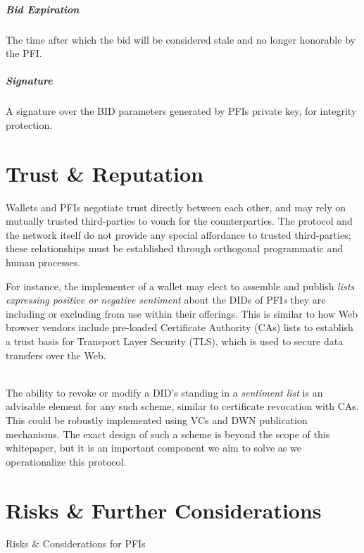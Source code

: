 \documentclass[11pt]{article}
\begin{document}
\subparagraph{Bid Expiration}

The time after which the bid will be considered stale and no longer honorable by the PFI. 

\subparagraph{Signature}

A signature over the BID parameters generated by PFIs private key, for integrity protection. 

\vspace{2\baselineskip}
\section{Trust & Reputation}

\vspace{1\baselineskip}
Wallets and PFIs negotiate trust directly between each other, and may rely on mutually trusted third-parties to vouch for the counterparties. The protocol and the network itself do not provide any special affordance to trusted third-parties; these relationships must be established through orthogonal programmatic and human processes.  

\vspace{1\baselineskip}
For instance, the implementer of a wallet may elect to assemble and publish \textit{lists expressing positive or negative sentiment} about the DIDs of PFI\textit{s }they are including or excluding from use within their offerings. This is similar to how Web browser vendors include pre-loaded Certificate Authority (CAs) lists to establish a trust basis for Transport Layer Security (TLS), which is used to secure data transfers over the Web. 

 \\ The ability to revoke or modify a DID’s standing in a \textit{sentiment list} is an advisable element for any such scheme, similar to certificate revocation with CAs. This could be robustly implemented using VCs and DWN publication mechanisms. The exact design of such a scheme is beyond the scope of this whitepaper, but it is an important component we aim to solve as we operationalize this protocol.

\vspace{1\baselineskip}
\section{Risks & Further Considerations}

\vspace{1\baselineskip}
{\LARGE Risks $\&$ Considerations for PFIs}
\end{document}
